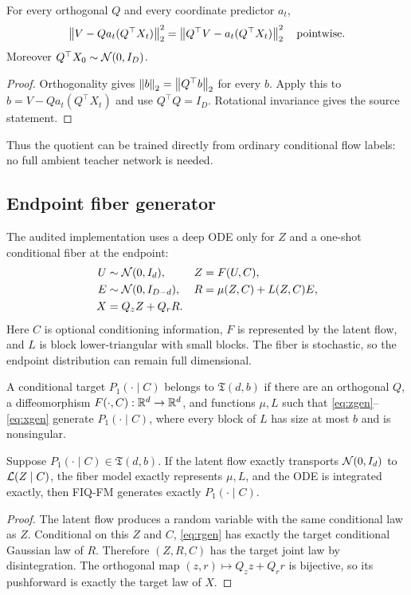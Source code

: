 \begin{theorem}
For every orthogonal $Q$ and every coordinate predictor $a_t$,
\begin{equation}
 \left\lVert V-Q a_t(Q^\top X_t)\right\rVert_2^2
 =\left\lVert Q^\top V-a_t(Q^\top X_t)\right\rVert_2^2
 \quad\text{pointwise}.
 \label{eq:isometry}
\end{equation}
Moreover $Q^\top X_0\sim\mathcal N(0,I_D)$.
\end{theorem}
\begin{proof}
Orthogonality gives $\left\lVert b\right\rVert_2=\left\lVert Q^\top b\right\rVert_2$ for every $b$.  Apply this to $b=V-Qa_t(Q^\top X_t)$ and use $Q^\top Q=I_D$.  Rotational invariance gives the source statement.
\end{proof}

Thus the quotient can be trained directly from ordinary conditional flow labels: no full ambient teacher network is needed.

\subsection{Endpoint fiber generator}

The audited implementation uses a deep ODE only for $Z$ and a one-shot conditional fiber at the endpoint:
\begin{align}
 U&\sim\mathcal N(0,I_d), & Z&=F(U,C),\label{eq:zgen}\\
 E&\sim\mathcal N(0,I_{D-d}), & R&=\mu(Z,C)+L(Z,C)E,\label{eq:rgen}\\
 X&=Q_zZ+Q_rR.\label{eq:xgen}
\end{align}
Here $C$ is optional conditioning information, $F$ is represented by the latent flow, and $L$ is block lower-triangular with small blocks.  The fiber is stochastic, so the endpoint distribution can remain full dimensional.

\begin{definition}
A conditional target $P_1(\cdot\mid C)$ belongs to $\mathfrak T(d,b)$ if there are an orthogonal $Q$, a diffeomorphism $F(\cdot,C):\mathbb R^d\to\mathbb R^d$, and functions $\mu,L$ such that \eqref{eq:zgen}--\eqref{eq:xgen} generate $P_1(\cdot\mid C)$, where every block of $L$ has size at most $b$ and is nonsingular.
\end{definition}

\begin{theorem}
Suppose $P_1(\cdot\mid C)\in\mathfrak T(d,b)$.  If the latent flow exactly transports $\mathcal N(0,I_d)$ to $\mathcal L(Z\mid C)$, the fiber model exactly represents $\mu,L$, and the ODE is integrated exactly, then FIQ-FM generates exactly $P_1(\cdot\mid C)$.
\end{theorem}
\begin{proof}
The latent flow produces a random variable with the same conditional law as $Z$.  Conditional on this $Z$ and $C$, \eqref{eq:rgen} has exactly the target conditional Gaussian law of $R$.  Therefore $(Z,R,C)$ has the target joint law by disintegration.  The orthogonal map $(z,r)\mapsto Q_zz+Q_rr$ is bijective, so its pushforward is exactly the target law of $X$.
\end{proof}

